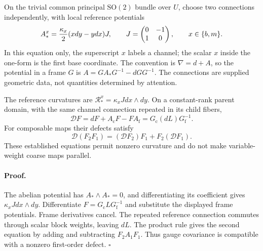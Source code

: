 On the trivial common principal \(\mathrm{SO}(2)\) bundle over \(U\),
choose two connections independently, with local reference potentials
\begin{equation}
 A^x_*={\kappa_x\over2}(x dy-y dx)J,\qquad
 J=\begin{pmatrix}0&-1\\1&0\end{pmatrix},\qquad x\in\{b,m\}.
\label{eq:rg-cover-nonflat-potential}
\end{equation}
In this equation only, the superscript \(x\) labels a channel; the scalar
\(x\) inside the one-form is the first base coordinate. The convention is
\(\nabla=d+A\), so the potential in a frame \(G\) is
\(A=GA_*G^{-1}-dG G^{-1}\). The connections are supplied geometric data,
not quantities determined by attention. 

The reference curvatures are
\(\mathcal R^x_*=\kappa_xJ dx\wedge dy\). On a constant-rank parent
domain, with the same channel connection repeated in its child fibers,
\begin{equation}
 \mathcal D F=dF+A_{\mathrm c}F-FA_{\mathrm f}
   =G_{\mathrm c}(dL)G_{\mathrm f}^{-1}.
\label{eq:rg-cover-connection-defect}
\end{equation}
For composable maps their defects satisfy
\begin{equation}
 \mathcal D(F_2F_1)=(\mathcal D F_2)F_1+F_2(\mathcal D F_1).
\label{eq:rg-cover-defect-composition}
\end{equation}
These established equations permit nonzero curvature and do not make
variable-weight coarse maps parallel. 

\paragraph{Proof.}
The abelian potential has \(A_*\wedge A_*=0\), and differentiating its
coefficient gives \(\kappa_xJ dx\wedge dy\). Differentiate
\(F=G_{\mathrm c}LG_{\mathrm f}^{-1}\) and substitute the displayed
frame potentials. Frame derivatives cancel. The repeated reference
connection commutes through scalar block weights, leaving \(dL\).
The product rule gives the second equation by adding and subtracting
\(F_2A_1F_1\). Thus gauge covariance is compatible with a nonzero
first-order defect. \(\square\)

